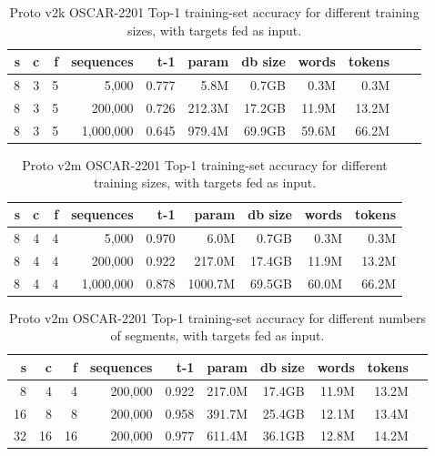 \begin{table}[H]
\centering
\caption{Proto v2k OSCAR-2201 Top-1 training-set accuracy for different training sizes, with targets fed as input.}
\label{tab:protov2k-oscar-train-top1-accuracy-multisentencePredictions}
\begin{tabular}{rrrrrrrrrrr}
\toprule
\textbf{s} & \textbf{c} & \textbf{f} & \textbf{sequences} & \textbf{t-1} & \textbf{param} & \textbf{db size} & \textbf{words} & \textbf{tokens} \\
\midrule
8 & 3 & 5 & 5,000     & 0.777 & 5.8M & 0.7GB & 0.3M & 0.3M \\
8 & 3 & 5 & 200,000   & 0.726 & 212.3M & 17.2GB & 11.9M & 13.2M \\
8 & 3 & 5 & 1,000,000 & 0.645 & 979.4M & 69.9GB & 59.6M & 66.2M \\
\bottomrule
\end{tabular}
\end{table}

\begin{table}[H]
\centering
\caption{Proto v2m OSCAR-2201 Top-1 training-set accuracy for different training sizes, with targets fed as input.}
\label{tab:protov2m-oscar-train-top1-accuracy-inferenceLeakyIntegrateAndFire}
\begin{tabular}{rrrrrrrrr}
\toprule
\textbf{s} & \textbf{c} & \textbf{f} & \textbf{sequences} & \textbf{t-1} & \textbf{param} & \textbf{db size} & \textbf{words} & \textbf{tokens} \\
\midrule
8 & 4 & 4 & 5,000     & 0.970 & 6.0M & 0.7GB & 0.3M & 0.3M \\
8 & 4 & 4 & 200,000   & 0.922 & 217.0M & 17.4GB & 11.9M & 13.2M \\
8 & 4 & 4 & 1,000,000 & 0.878 & 1000.7M & 69.5GB & 60.0M & 66.2M  \\
\bottomrule
\end{tabular}
\end{table}

\begin{table}[H]
\centering
\caption{Proto v2m OSCAR-2201 Top-1 training-set accuracy for different numbers of segments, with targets fed as input.}
\label{tab:protov2m-oscar-train-top1-accuracy-segmentSizes-inferenceLeakyIntegrateAndFire}
\begin{tabular}{rrrrrrrrrr}
\toprule
\textbf{s} & \textbf{c} & \textbf{f} & \textbf{sequences} & \textbf{t-1} & \textbf{param} & \textbf{db size} & \textbf{words} & \textbf{tokens} \\
\midrule
8  & 4  & 4  & 200,000 & 0.922 & 217.0M & 17.4GB & 11.9M & 13.2M \\
16 & 8  & 8  & 200,000 & 0.958 & 391.7M & 25.4GB & 12.1M & 13.4M \\
32 & 16 & 16 & 200,000 & 0.977 & 611.4M & 36.1GB & 12.8M & 14.2M \\
\bottomrule
\end{tabular}
\end{table}

